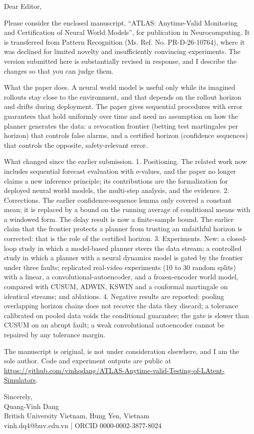 \documentclass[11pt,a4paper]{article}
\begin{document}
Dear Editor,

Please consider the enclosed manuscript, ``ATLAS: Anytime-Valid Monitoring and Certification of Neural World Models'', for publication in Neurocomputing. It is transferred from Pattern Recognition (Ms. Ref. No. PR-D-26-10764), where it was declined for limited novelty and insufficiently convincing experiments. The version submitted here is substantially revised in response, and I describe the changes so that you can judge them.

What the paper does. A neural world model is useful only while its imagined rollouts stay close to the environment, and that depends on the rollout horizon and drifts during deployment. The paper gives sequential procedures with error guarantees that hold uniformly over time and need no assumption on how the planner generates the data: a revocation frontier (betting test martingales per horizon) that controls false alarms, and a certified horizon (confidence sequences) that controls the opposite, safety-relevant error.

What changed since the earlier submission. 1. Positioning. The related work now includes sequential forecast evaluation with e-values, and the paper no longer claims a new inference principle; its contributions are the formalization for deployed neural world models, the multi-step analysis, and the evidence. 2. Corrections. The earlier confidence-sequence lemma only covered a constant mean; it is replaced by a bound on the running average of conditional means with a windowed form. The delay result is now a finite-sample bound. The earlier claim that the frontier protects a planner from trusting an unfaithful horizon is corrected: that is the role of the certified horizon. 3. Experiments. New: a closed-loop study in which a model-based planner steers the data stream; a controlled study in which a planner with a neural dynamics model is gated by the frontier under three faults; replicated real-video experiments (10 to 30 random splits) with a linear, a convolutional-autoencoder, and a frozen-encoder world model, compared with CUSUM, ADWIN, KSWIN and a conformal martingale on identical streams; and ablations. 4. Negative results are reported: pooling overlapping horizon chains does not recover the data they discard; a tolerance calibrated on pooled data voids the conditional guarantee; the gate is slower than CUSUM on an abrupt fault; a weak convolutional autoencoder cannot be repaired by any tolerance margin.

The manuscript is original, is not under consideration elsewhere, and I am the sole author. Code and experiment outputs are public at \url{https://github.com/vinhqdang/ATLAS-Anytime-valid-Testing-of-LAtent-Simulators}.

\noindent Sincerely, \\
Quang-Vinh Dang \\
British University Vietnam, Hung Yen, Vietnam \\
vinh.dq4@buv.edu.vn  |  ORCID 0000-0002-3877-8024
\end{document}

